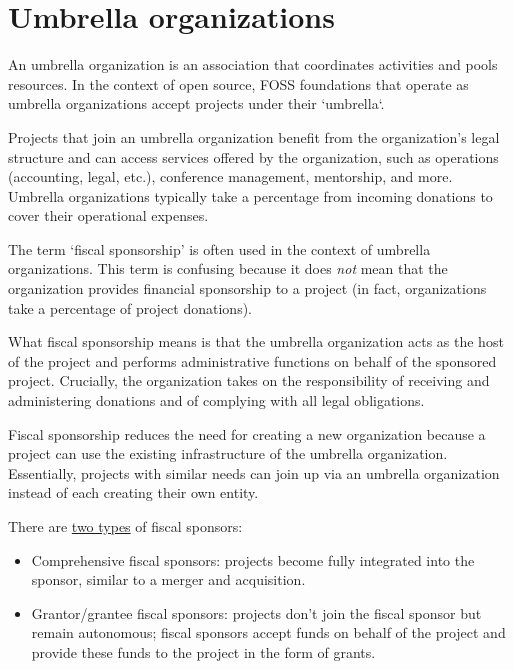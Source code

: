 


\chapter{Umbrella organizations}

An umbrella organization is an association that coordinates activities and pools resources.  In the context of open source, FOSS foundations that operate as umbrella organizations accept projects under their `umbrella`.

Projects that join an umbrella organization benefit from the organization's legal structure and can access services offered by the organization, such as operations (accounting, legal, etc.), conference management, mentorship, and more.  Umbrella organizations typically take a percentage from incoming donations to cover their operational expenses.

The term `fiscal sponsorship' is often used in the context of umbrella organizations.  This term is confusing because it does \textit{not} mean that the organization provides financial sponsorship to a project (in fact, organizations take a percentage of project donations).

What fiscal sponsorship means is that the umbrella organization acts as the host of the project and performs administrative functions on behalf of the sponsored project.  Crucially, the organization takes on the responsibility of receiving and administering donations and of complying with all legal obligations.

Fiscal sponsorship reduces the need for creating a new organization because a project can use the existing infrastructure of the umbrella organization.  Essentially, projects with similar needs can join up via an umbrella organization instead of each creating their own entity.

There are \href{https://lwn.net/Articles/548542/}{two types} of fiscal sponsors:

\begin{itemize}

\itemsep 0.50em

\item Comprehensive fiscal sponsors: projects become fully integrated into the sponsor, similar to a merger and acquisition.

\item Grantor/grantee fiscal sponsors: projects don't join the fiscal sponsor but remain autonomous; fiscal sponsors accept funds on behalf of the project and provide these funds to the project in the form of grants.

\end{itemize}


